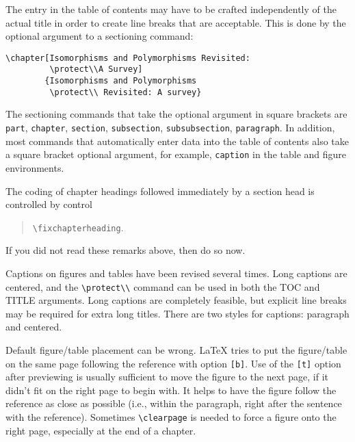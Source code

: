 The entry in the table of contents may have to be crafted independently
of the actual title in order to create line breaks that are acceptable.
This is done by the optional argument to a sectioning command:

\footnotesize
\verb"\chapter[Isomorphisms and Polymorphisms Revisited:"\\
\verb"         \protect\\A Survey]"\\
\verb"        {Isomorphisms and Polymorphisms"\\
\verb"         \protect\\ Revisited: A survey}"
\normalsize

The sectioning commands that take the optional argument in square
brackets are {\tt part}, {\tt chapter}, {\tt section}, {\tt subsection},
{\tt subsubsection}, {\tt paragraph}. In addition, most commands that
automatically enter data into the table of contents also take a square
bracket optional argument, for example, {\tt caption} in the table and
figure environments.

The coding of chapter headings followed immediately by a section head is
controlled by control
\begin{quote} \verb|\fixchapterheading|.\end{quote}
\noindent If you did not read these remarks above, then do so now.

Captions on figures and tables have been revised several times. Long
captions are centered, and the \verb|\protect\\| command can be used in
both the TOC and TITLE arguments.  Long captions are completely
feasible, but explicit line breaks may be required for extra long
titles. There are two styles for captions: paragraph and centered.

Default figure/table placement can be wrong. \LaTeX{} tries to put the
figure/table on the same page following the reference with option
\verb"[b]". Use of the \verb|[t]| option after previewing is usually
sufficient to move the figure to the next page, if it didn't fit on the
right page to begin with. It helps to have the figure follow the
reference as close as possible (i.e., within the paragraph, right after
the sentence with the reference). Sometimes \verb"\clearpage" is needed
to force a figure onto the right page, especially at the end of a
chapter.

